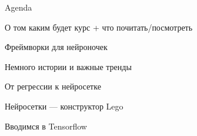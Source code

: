 \documentclass[notes,12pt, aspectratio=169]{beamer}
\newenvironment{wideitemize}{\itemize\addtolength{\itemsep}{10pt}}{\enditemize}
\begin{document}
{
	\begin{frame}
\end{frame}
}

\begin{frame}{Agenda}
\begin{wideitemize}
	\item О том каким будет курс + что почитать/посмотреть
	\item  Фреймворки для нейроночек
	\item  Немного истории и важные тренды 
	\item От регрессии к нейросетке
	\item Нейросетки — конструктор Lego
	\item Вводимся в Tensorflow
\end{wideitemize} 
\end{frame}
\end{document}
